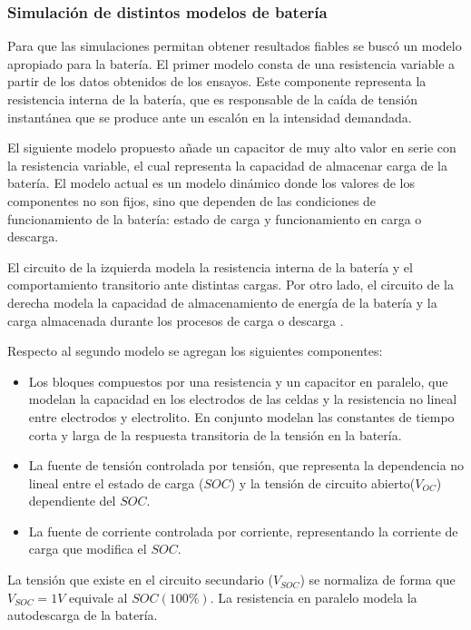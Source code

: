 \subsubsection{Simulación de distintos modelos de batería}
Para que las simulaciones permitan obtener resultados fiables se buscó un modelo apropiado para la batería.
El primer modelo consta de una resistencia variable a partir de los datos obtenidos de los ensayos. 
Este componente representa la resistencia interna de la batería, que es responsable de la caída de tensión instantánea que se produce ante un escalón en la intensidad demandada.

El siguiente modelo propuesto añade un capacitor de muy alto valor en serie con la resistencia variable,
el cual representa la capacidad de almacenar carga de la batería.
El modelo actual es un modelo dinámico donde los valores de los componentes no son fijos,
sino que dependen de las condiciones de funcionamiento de la batería: estado de carga y funcionamiento en carga o descarga.

El circuito de la izquierda modela la resistencia interna de la batería y el comportamiento transitorio ante distintas cargas.
Por otro lado, el circuito de la derecha modela la capacidad de almacenamiento de energía de la batería y la carga almacenada durante los procesos de carga o descarga \cite{bateria}.

Respecto al segundo modelo se agregan los siguientes componentes:
\begin{itemize}
    \item Los bloques compuestos por una resistencia y un capacitor en paralelo, que modelan la capacidad en los electrodos de las celdas y
    la resistencia no lineal entre electrodos y electrolito.
    En conjunto modelan las constantes de tiempo corta y larga de la respuesta transitoria de la tensión en la batería\cite{bateria_espanol}.
    \item La fuente de tensión controlada por tensión, que representa la dependencia no lineal entre el estado de carga ($SOC$)
    y la tensión de circuito abierto($V_{OC}$) dependiente del $SOC$.
    \item La fuente de corriente controlada por corriente, representando la corriente de carga que modifica el $SOC$.
\end{itemize}
La tensión que existe en el circuito secundario ($V_{SOC}$) se normaliza de forma que $V_{SOC}=1V$ equivale al $SOC (100\%)$.
La resistencia en paralelo modela la autodescarga de la batería.


